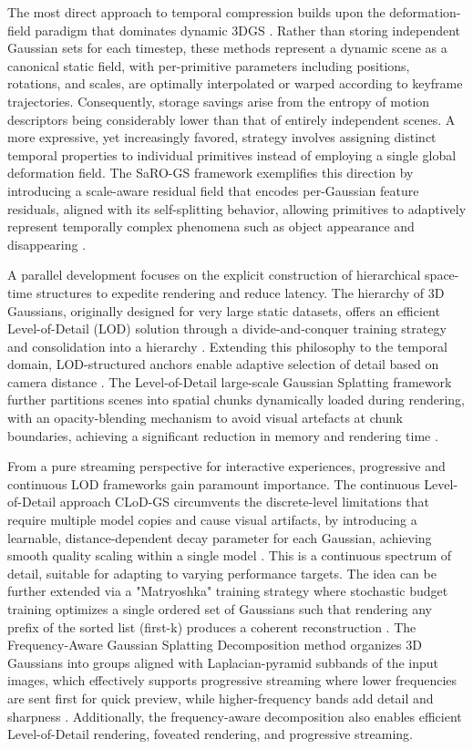 \documentclass[11pt,a4paper]{article}
\begin{document}
The most direct approach to temporal compression builds upon the deformation-field paradigm that dominates dynamic 3DGS \cite{arxiv:2412.06299v1}. Rather than storing independent Gaussian sets for each timestep, these methods represent a dynamic scene as a canonical static field, with per-primitive parameters including positions, rotations, and scales, are optimally interpolated or warped according to keyframe trajectories. Consequently, storage savings arise from the entropy of motion descriptors being considerably lower than that of entirely independent scenes. A more expressive, yet increasingly favored, strategy involves assigning distinct temporal properties to individual primitives instead of employing a single global deformation field. The SaRO-GS framework exemplifies this direction by introducing a scale-aware residual field that encodes per-Gaussian feature residuals, aligned with its self-splitting behavior, allowing primitives to adaptively represent temporally complex phenomena such as object appearance and disappearing \cite{arxiv:2412.06299v1}.

A parallel development focuses on the explicit construction of hierarchical space-time structures to expedite rendering and reduce latency. The hierarchy of 3D Gaussians, originally designed for very large static datasets, offers an efficient Level-of-Detail (LOD) solution through a divide-and-conquer training strategy and consolidation into a hierarchy \cite{arxiv:2406.12080v1}. Extending this philosophy to the temporal domain, LOD-structured anchors enable adaptive selection of detail based on camera distance \cite{arxiv:2403.17898v1}. The Level-of-Detail large-scale Gaussian Splatting framework further partitions scenes into spatial chunks dynamically loaded during rendering, with an opacity-blending mechanism to avoid visual artefacts at chunk boundaries, achieving a significant reduction in memory and rendering time \cite{arxiv:2505.23158v2}.

From a pure streaming perspective for interactive experiences, progressive and continuous LOD frameworks gain paramount importance. The continuous Level-of-Detail approach CLoD-GS circumvents the discrete-level limitations that require multiple model copies and cause visual artifacts, by introducing a learnable, distance-dependent decay parameter for each Gaussian, achieving smooth quality scaling within a single model \cite{arxiv:2510.09997v2}. This is a continuous spectrum of detail, suitable for adapting to varying performance targets. The idea can be further extended via a "Matryoshka" training strategy where stochastic budget training optimizes a single ordered set of Gaussians such that rendering any prefix of the sorted list (first-k) produces a coherent reconstruction \cite{arxiv:2603.19234v2}. The Frequency-Aware Gaussian Splatting Decomposition method organizes 3D Gaussians into groups aligned with Laplacian-pyramid subbands of the input images, which effectively supports progressive streaming where lower frequencies are sent first for quick preview, while higher-frequency bands add detail and sharpness \cite{arxiv:2503.21226v2}. Additionally, the frequency-aware decomposition also enables efficient Level-of-Detail rendering, foveated rendering, and progressive streaming.
\end{document}
